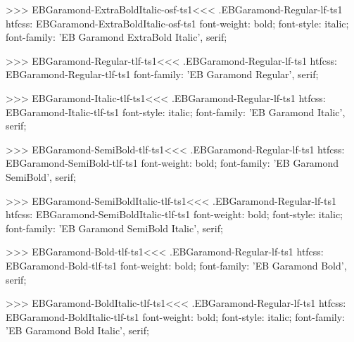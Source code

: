 {{{{{{{>>>
\<EBGaramond-ExtraBoldItalic-osf-ts1\><<<
.EBGaramond-Regular-lf-ts1
htfcss:  EBGaramond-ExtraBoldItalic-osf-ts1  font-weight: bold; font-style: italic; font-family: 'EB Garamond ExtraBold Italic', serif;

>>>
\<EBGaramond-Regular-tlf-ts1\><<<
.EBGaramond-Regular-lf-ts1
htfcss:  EBGaramond-Regular-tlf-ts1  font-family: 'EB Garamond Regular', serif;

>>>
\<EBGaramond-Italic-tlf-ts1\><<<
.EBGaramond-Regular-lf-ts1
htfcss:  EBGaramond-Italic-tlf-ts1  font-style: italic; font-family: 'EB Garamond Italic', serif;

>>>
\<EBGaramond-SemiBold-tlf-ts1\><<<
.EBGaramond-Regular-lf-ts1
htfcss:  EBGaramond-SemiBold-tlf-ts1  font-weight: bold; font-family: 'EB Garamond SemiBold', serif;

>>>
\<EBGaramond-SemiBoldItalic-tlf-ts1\><<<
.EBGaramond-Regular-lf-ts1
htfcss:  EBGaramond-SemiBoldItalic-tlf-ts1  font-weight: bold; font-style: italic; font-family: 'EB Garamond SemiBold Italic', serif;

>>>
\<EBGaramond-Bold-tlf-ts1\><<<
.EBGaramond-Regular-lf-ts1
htfcss:  EBGaramond-Bold-tlf-ts1  font-weight: bold; font-family: 'EB Garamond Bold', serif;

>>>
\<EBGaramond-BoldItalic-tlf-ts1\><<<
.EBGaramond-Regular-lf-ts1
htfcss:  EBGaramond-BoldItalic-tlf-ts1  font-weight: bold; font-style: italic; font-family: 'EB Garamond Bold Italic', serif;

}}}}}}}
